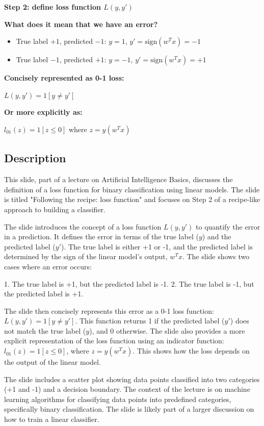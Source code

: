 \documentclass{article}%
\begin{document}
\textbf{Step 2: define loss function $L(y, y')$}

\textbf{What does it mean that we have an error?}

\begin{itemize}
    \item True label $+1$, predicted $-1$:
    $y = 1$, $y' = \text{sign}(w^Tx) = -1$
    \item True label $-1$, predicted $+1$:
    $y = -1$, $y' = \text{sign}(w^Tx) = +1$
\end{itemize}

\textbf{Concisely represented as 0-1 loss:}

$L(y, y') = 1[y \neq y']$

\textbf{Or more explicitly as:}

$l_{01}(z) = 1[z \le 0]$ where $z = y(w^Tx)$
%
\subsection{Description}%
This slide, part of a lecture on Artificial Intelligence Basics, discusses the definition of a loss function for binary classification using linear models.  The slide is titled "Following the recipe: loss function" and focuses on Step 2 of a recipe-like approach to building a classifier.

The slide introduces the concept of a loss function $L(y, y')$ to quantify the error in a prediction.  It defines the error in terms of the true label ($y$) and the predicted label ($y'$).  The true label is either +1 or -1, and the predicted label is determined by the sign of the linear model's output, $w^Tx$.  The slide shows two cases where an error occurs:

1. The true label is +1, but the predicted label is -1.
2. The true label is -1, but the predicted label is +1.

The slide then concisely represents this error as a 0-1 loss function: $L(y, y') = 1[y \neq y']$.  This function returns 1 if the predicted label ($y'$) does not match the true label ($y$), and 0 otherwise.  The slide also provides a more explicit representation of the loss function using an indicator function: $l_{01}(z) = 1[z \le 0]$, where $z = y(w^Tx)$.  This shows how the loss depends on the output of the linear model.

The slide includes a scatter plot showing data points classified into two categories (+1 and -1) and a decision boundary.  The context of the lecture is on machine learning algorithms for classifying data points into predefined categories, specifically binary classification. The slide is likely part of a larger discussion on how to train a linear classifier.%
\end{document}
